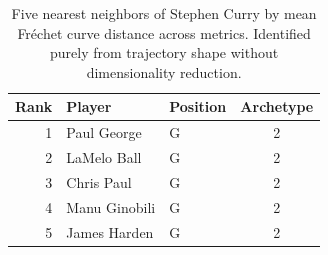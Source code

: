 \begin{table}[htbp]
  \centering\small
  \begin{tabular}{rllc}
    \toprule
    Rank & Player & Position & Archetype \\
    \midrule
    1 & Paul George & G & 2 \\
    2 & LaMelo Ball & G & 2 \\
    3 & Chris Paul & G & 2 \\
    4 & Manu Ginobili & G & 2 \\
    5 & James Harden & G & 2 \\
    \bottomrule
  \end{tabular}
  \caption{Five nearest neighbors of Stephen Curry by mean Fr\'{e}chet curve distance across metrics. Identified purely from trajectory shape without dimensionality reduction.}
  \label{tab:Stephen_Curry_frechet_curve_neighbors}
\end{table}

